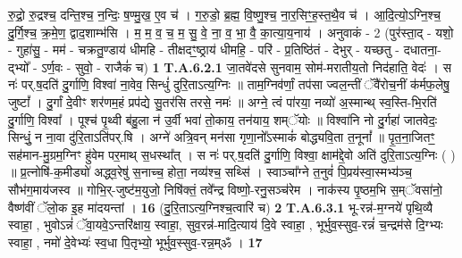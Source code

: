 \documentclass[17pt]{extarticle}
\begin{document}
                रु॒द्रो॒ रु॒द्रश्च॒ दन्ति॒श्च॒ न॒न्दिः॒ ष॒ण्मु॒ख॒ ए॒व च॑ । ग॒रु॒डो॒ ब्र॒ह्म॒ वि॒ष्णु॒श्च॒ ना॒र॒सिꣳ॒॒ह॒स्त॒थै॒व च॑ । आ॒दि॒त्यो॒ऽग्नि॒श्च॒ दु॒र्गि॒श्च॒ क्र॒मे॒ण॒ द्वाद॒शाम्भ॑सि ।    म॒ म॒ व॒ च॒ म॒ सु॒ वे॒ ना॒ व॒ भा॒ वै॒ का॒त्या॒य॒नाय॑ ।   अनुवाकं - 2 \newline
                                      (पुर॑स्ता॒द् - यशो॒ - गुहा॑सु॒ - मम॑ - चक्रतु॒ण्डाय॑ धीमहि - तीक्षदꣳ॒॒ष्ठ्राय॑ धीमहि॒ - परि॑ - प्र॒तिष्ठि॑तं - देभुर् - यच्छतु - दधातना॒- द्भ्यो᳚ - ऽर्ण॒वः - सुवो॒ - राजैकं॑ च) \textbf{1} \newline \newline
                                \textbf{ T.A.6.2.1} \newline
                  जा॒तवे॑दसे सुनवाम॒ सोम॑-मरातीय॒तो निद॑हाति॒ वेदः॑ । स नः॑ पर्.ष॒दति॑ दु॒र्गाणि॒ विश्वा॑ ना॒वेव॒ सिन्धुं॑ दुरि॒ताऽत्य॒ग्निः ॥  ताम॒ग्निव॑र्णां॒ तप॑सा ज्वल॒न्तीं ॅवै॑रोच॒नीं क॑र्मफ॒लेषु॒ जुष्टां᳚ । दु॒र्गां दे॒वीꣳ शर॑णम॒हं प्रप॑द्ये सु॒तर॑सि तरसे॒ नमः॑ ॥  अग्ने॒ त्वं पा॑रया॒ नव्यो॑ अ॒स्मान्थ् स्व॒स्ति-भि॒रति॑ दु॒र्गाणि॒ विश्वा᳚ । पूश्च॑ पृ॒थ्वी ब॑हु॒ला न॑ उ॒र्वी भवा॑ तो॒काय॒ तन॑याय॒ शम्ॅयोः ॥  विश्वा॑नि नो दु॒र्गहा॑ जातवेदः॒ सिन्धुं॒ न ना॒वा दु॑रि॒ताऽति॑पर्.षि । अग्ने॑ अत्रि॒वन् मन॑सा गृणा॒नो᳚ऽस्माकं॑ बोद्ध्यवि॒ता त॒नूनां᳚ ॥  पृ॒त॒ना॒जितꣳ॒॒ सह॑मान-मु॒ग्रम॒ग्निꣳ हु॑वेम पर॒माथ् स॒धस्था᳚त् । स नः॑ पर्.ष॒दति॑ दु॒र्गाणि॒ विश्वा॒ क्षाम॑द्दे॒वो अति॑ दुरि॒ताऽत्य॒ग्निः ( ) ॥  प्र॒त्नोषि॑-क॒मीड्यो॑ अद्ध्व॒रेषु॑ स॒नाच्च॒ होता॒ नव्य॑श्च॒ सथ्सि॑ । स्वाञ्चा᳚ग्ने त॒नुवं॑ पि॒प्रय॑स्वा॒स्मभ्य॑ञ्च॒ सौभ॑ग॒माय॑जस्व ॥  गोभि॒र्-जुष्ट॑म॒युजो॒ निषि॑क्तं॒ तवे᳚न्द्र विष्णो॒-रनु॒सञ्च॑रेम ।  नाक॑स्य पृ॒ष्ठम॒भि स॒म्ॅवसा॑नो॒ वैष्ण॑वीं ॅलो॒क इ॒ह मा॑दयन्तां । \textbf{ 16} \newline
                  \newline
                                                        (दु॒रि॒ताऽत्य॒ग्निश्च॒त्वारि॑ च) \textbf{2} \newline \newline
                                \textbf{ T.A.6.3.1} \newline
                  भू-रन्न॑-म॒ग्नये॑ पृथि॒व्यै स्वाहा॒ ,  भुवोऽन्नं॑ ॅवा॒यवे॒ऽन्तरि॑क्षाय॒ स्वाहा॒,  सुव॒रन्न॑-मादि॒त्याय॑ दि॒वे स्वाहा॒ ,   भूर्भुव॒स्सुव॒-रन्नं॑ च॒न्द्रम॑से दि॒ग्भ्यः स्वाहा॒ , नमो॑ दे॒वेभ्यः॑ स्व॒धा पि॒तृभ्यो॒ भूर्भुव॒स्सुव॒-रन्न॒म्ॐ । \textbf{ 17} \newline
                  \newline
                                                         \textbf{} \newline \newline
\end{document}
